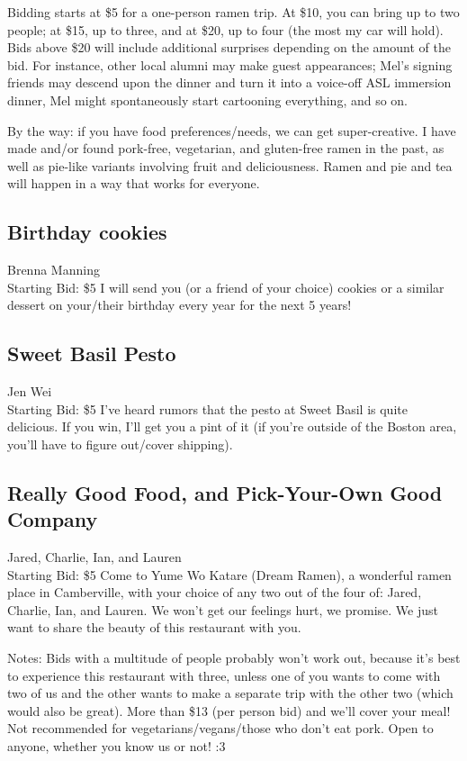 \documentclass[11pt]{article}
\begin{document}
Bidding starts at \$5 for a one-person ramen trip. At \$10,  you can bring up to two people; at \$15, up to three, and at \$20, up to four (the most my car will hold). Bids above \$20 will include additional surprises depending on the amount of the bid. For instance, other local alumni may make guest appearances; Mel's signing friends may descend upon the dinner and turn it into a voice-off ASL immersion dinner, Mel might spontaneously start cartooning everything, and so on.

By the way: if you have food preferences/needs, we can get super-creative. I have made and/or found pork-free, vegetarian, and gluten-free ramen in the past, as well as pie-like variants involving fruit and deliciousness. Ramen and pie and tea will happen in a way that works for everyone.
\subsection{Birthday cookies}
Brenna Manning
\\
Starting Bid: \$5
\newline
I will send you (or a friend of your choice) cookies or a similar dessert on your/their birthday every year for the next 5 years!
\subsection{Sweet Basil Pesto}
Jen Wei
\\
Starting Bid: \$5
\newline
I've heard rumors that the pesto at Sweet Basil is quite delicious. If you win, I'll get you a pint of it (if you're outside of the Boston area, you'll have to figure out/cover shipping).
\subsection{Really Good Food, and Pick-Your-Own Good Company}
Jared, Charlie, Ian, and Lauren
\\
Starting Bid: \$5
\newline
Come to Yume Wo Katare (Dream Ramen), a wonderful ramen place in Camberville, with your choice of any two out of the four of: Jared, Charlie, Ian, and Lauren. We won't get our feelings hurt, we promise. We just want to share the beauty of this restaurant with you. 

Notes: Bids with a multitude of people probably won't work out, because it's best to experience this restaurant with three, unless one of you wants to come with two of us and the other wants to make a separate trip with the other two (which would also be great). More than \$13 (per person bid) and we'll cover your meal! Not recommended for vegetarians/vegans/those who don't eat pork. Open to anyone, whether you know us or not! :3
\end{document}
